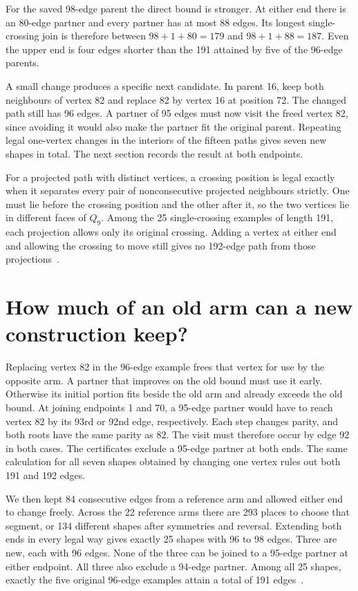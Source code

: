 \documentclass[11pt,a4paper]{article}
\begin{document}
For the saved 98-edge parent the direct bound is stronger. At either
end there is an 80-edge partner and every partner has at most 88
edges. Its longest single-crossing join is therefore between
\(98+1+80=179\) and \(98+1+88=187\). Even the upper end is four
edges shorter than the 191 attained by five of the 96-edge parents.

A small change produces a specific next candidate. In parent 16,
keep both neighbours of vertex 82 and replace 82 by vertex 16 at
position 72. The changed path still has 96 edges. A partner of 95
edges must now visit the freed vertex 82, since avoiding it would
also make the partner fit the original parent. Repeating legal
one-vertex changes in the interiors of the fifteen paths gives seven
new shapes in total. The next section records the result at both endpoints.

For a projected path with distinct vertices, a crossing position is
legal exactly when it separates every pair of nonconsecutive
projected neighbours strictly. One must lie before the crossing
position and the other after it, so the two vertices lie in different
faces of $Q_9$.
Among the 25 single-crossing examples of length 191, each projection
allows only its original crossing. Adding a vertex at either end and
allowing the crossing to move still gives no 192-edge path from
those projections~\cite{long249}.

\section{How much of an old arm can a new construction keep?}

Replacing vertex 82 in the 96-edge example frees that vertex for use
by the opposite arm. A partner that improves on the old bound must
use it early. Otherwise its initial portion fits beside the old arm
and already exceeds the old bound. At joining endpoints 1 and 70, a
95-edge partner would have to reach vertex 82 by its 93rd or 92nd
edge, respectively. Each step changes parity, and both roots have the
same parity as 82. The visit must therefore occur by edge 92 in both
cases. The certificates exclude a 95-edge partner at
both ends. The same calculation for all seven shapes obtained by
changing one vertex rules out both 191 and 192 edges.

We then kept 84 consecutive edges from a reference arm and allowed
either end to change freely. Across the 22 reference arms there are
293 places to choose that segment, or 134 different shapes after
symmetries and reversal. Extending both ends in every legal way gives
exactly 25 shapes with 96 to 98 edges. Three are new, each with 96
edges. None of the three can be joined to a 95-edge partner at either
endpoint. All three also exclude a 94-edge partner. Among all 25
shapes, exactly the five original 96-edge examples attain a total of
191 edges~\cite{corner250}.
\end{document}
